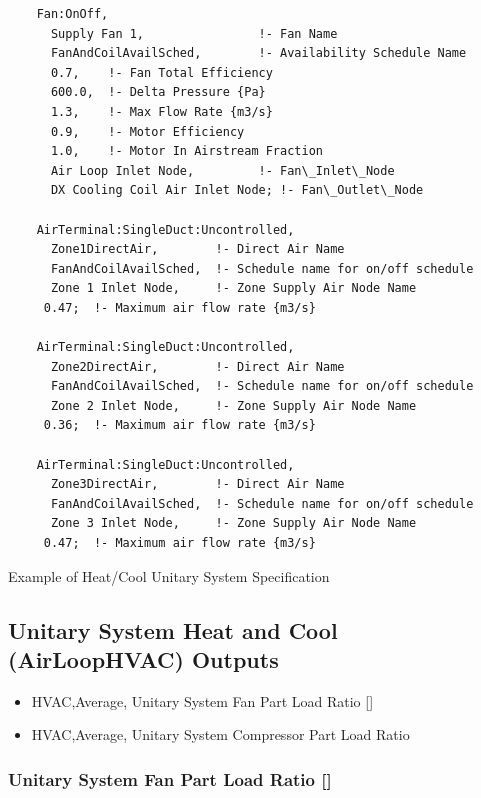 \begin{lstlisting}
    Fan:OnOff,
      Supply Fan 1,                !- Fan Name
      FanAndCoilAvailSched,        !- Availability Schedule Name
      0.7,    !- Fan Total Efficiency
      600.0,  !- Delta Pressure {Pa}
      1.3,    !- Max Flow Rate {m3/s}
      0.9,    !- Motor Efficiency
      1.0,    !- Motor In Airstream Fraction
      Air Loop Inlet Node,         !- Fan\_Inlet\_Node
      DX Cooling Coil Air Inlet Node; !- Fan\_Outlet\_Node

    AirTerminal:SingleDuct:Uncontrolled,
      Zone1DirectAir,        !- Direct Air Name
      FanAndCoilAvailSched,  !- Schedule name for on/off schedule
      Zone 1 Inlet Node,     !- Zone Supply Air Node Name
     0.47;  !- Maximum air flow rate {m3/s}

    AirTerminal:SingleDuct:Uncontrolled,
      Zone2DirectAir,        !- Direct Air Name
      FanAndCoilAvailSched,  !- Schedule name for on/off schedule
      Zone 2 Inlet Node,     !- Zone Supply Air Node Name
     0.36;  !- Maximum air flow rate {m3/s}

    AirTerminal:SingleDuct:Uncontrolled,
      Zone3DirectAir,        !- Direct Air Name
      FanAndCoilAvailSched,  !- Schedule name for on/off schedule
      Zone 3 Inlet Node,     !- Zone Supply Air Node Name
     0.47;  !- Maximum air flow rate {m3/s}
\end{lstlisting}

Example of Heat/Cool Unitary System Specification

\subsection{Unitary System Heat and Cool (AirLoopHVAC) Outputs}\label{unitary-system-heat-and-cool-airloophvac-outputs}

\begin{itemize}
\item
  HVAC,Average, Unitary System Fan Part Load Ratio {[]}
\item
  HVAC,Average, Unitary System Compressor Part Load Ratio
\end{itemize}

\subsubsection{Unitary System Fan Part Load Ratio {[]}}\label{unitary-system-fan-part-load-ratio-2}

